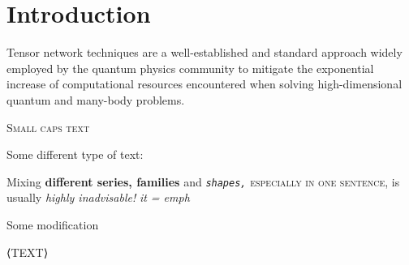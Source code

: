 \chapter{Introduction}
\label{chap:intro}
Tensor network techniques are a well-established \cite{Fannes1992,PhysRevLett.69.2863,SCHOLLWOCK201196,PhysRevLett.91.147902,verstraete2004renormalizationalgorithmsquantummanybody,vonDelftTNNotes,tensornetwork.org} and standard approach widely employed by the quantum physics community to mitigate the exponential increase of computational resources encountered when solving high-dimensional quantum and many-body problems.\vspace{\baselineskip}\\


\textsc{Small caps text}
{}


Some different type of text:\hfill

Mixing \textbf{different series, \textsf{families}} and
\textsl{\texttt{shapes,}} \textsc{especially in one sentence,}
is usually \emph{highly inadvisable!}\textit{ it = emph}

Some modification 

\MakeTextUppercase{⟨text⟩}









    








